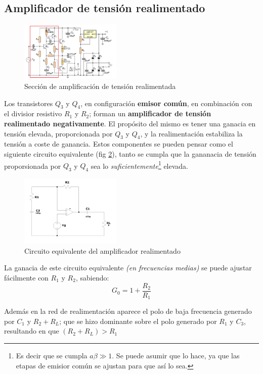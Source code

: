\documentclass[letterpaper, 10 pt, conference]{ieeeconf}  %
\begin{document}
\subsection{Amplificador de tensión realimentado}
\begin{figure}[H]
  \centering
  \includegraphics[width=0.43\textwidth]{./imagenes/placa_ampli_realimentado.png}
  \caption{Sección de amplificación de tensión realimentada}
  \label{fig:ampl_tension_reali}
\end{figure}
Los transistores $Q_3$ y $Q_4$, en configuración \textbf{emisor común}, en combinación con el divisior resistivo $R_1$ y $R_2$; forman un \textbf{amplificador de tensión realimentado negativamente}. El propósito del mismo es tener una ganacia en tensión elevada, proporcionada por $Q_3$ y $Q_4$, y la realimentación estabiliza la tensión a coste de ganancia. Estos componentes se pueden pensar como el siguiente circuito equivalente (fig \ref{fig:circ_eq_ampli_reali}), tanto se cumpla que la gananacia de tensión proporsionada por $Q_3$ y $Q_4$ sea lo \textit{suficientemente}\footnote{Es decir que se cumpla $a\beta \gg 1$. Se puede asumir que lo hace, ya que las etapas de emisior común se ajustan para que así lo sea.} elevada.

\begin{figure}[H]
  \centering
  \includegraphics[width=0.43\textwidth]{./imagenes/circ_eq_ampli_real.png}
  \caption{Circuito equivalente del amplificador realimentado}
  \label{fig:circ_eq_ampli_reali}
\end{figure}

La ganacia de este circuito equivalente \textit{(en frecuencias medias)} se puede ajustar fácilmente con $R_1$ y $R_2$, sabiendo:
\begin{equation} \label{eq:ganancia_ampli_real}
  G_0 = 1 + \frac{R_2}{R_1}
\end{equation}

Además en la red de realimentación aparece el polo de baja frecuencia generado por $C_1$ y $R_2 + R_L$; que se hizo dominante sobre el polo generado por $R_1$ y $C_3$, resultando en que $(R_2+R_L) > R_1$
\end{document}
